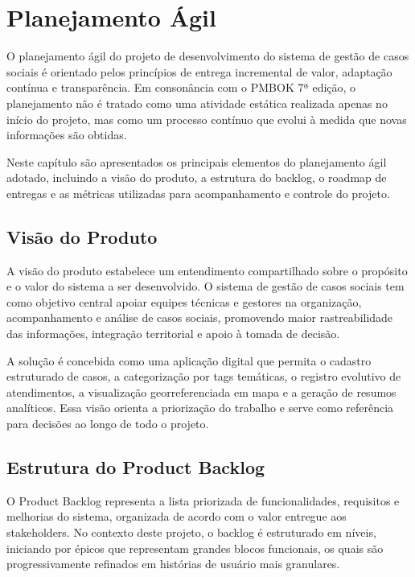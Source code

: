 \chapter{Planejamento Ágil}\label{chp:PlanejamentoAgil}

O planejamento ágil do projeto de desenvolvimento do sistema de gestão de casos sociais é orientado pelos princípios de entrega incremental de valor, adaptação contínua e transparência. Em consonância com o PMBOK 7ª edição, o planejamento não é tratado como uma atividade estática realizada apenas no início do projeto, mas como um processo contínuo que evolui à medida que novas informações são obtidas.

Neste capítulo são apresentados os principais elementos do planejamento ágil adotado, incluindo a visão do produto, a estrutura do backlog, o roadmap de entregas e as métricas utilizadas para acompanhamento e controle do projeto.

\section{Visão do Produto}

A visão do produto estabelece um entendimento compartilhado sobre o propósito e o valor do sistema a ser desenvolvido. O sistema de gestão de casos sociais tem como objetivo central apoiar equipes técnicas e gestores na organização, acompanhamento e análise de casos sociais, promovendo maior rastreabilidade das informações, integração territorial e apoio à tomada de decisão.

A solução é concebida como uma aplicação digital que permita o cadastro estruturado de casos, a categorização por tags temáticas, o registro evolutivo de atendimentos, a visualização georreferenciada em mapa e a geração de resumos analíticos. Essa visão orienta a priorização do trabalho e serve como referência para decisões ao longo de todo o projeto.

\section{Estrutura do Product Backlog}

O Product Backlog representa a lista priorizada de funcionalidades, requisitos e melhorias do sistema, organizada de acordo com o valor entregue aos stakeholders. No contexto deste projeto, o backlog é estruturado em níveis, iniciando por épicos que representam grandes blocos funcionais, os quais são progressivamente refinados em histórias de usuário mais granulares.

